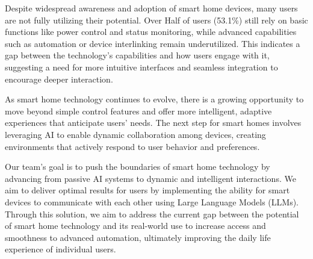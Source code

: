 \documentclass[conference]{IEEEtran}
\begin{document}
    \hspace{0.5em} Despite widespread awareness and adoption of smart home devices, many users are not fully utilizing their potential. Over Half of users (53.1\%) still rely on basic functions like power control and status monitoring, while advanced capabilities such as automation or device interlinking remain underutilized. This indicates a gap between the technology's capabilities and how users engage with it, suggesting a need for more intuitive interfaces and seamless integration to encourage deeper interaction.
    
    \hspace{0.5em} As smart home technology continues to evolve, there is a growing opportunity to move beyond simple control features and offer more intelligent, adaptive experiences that anticipate users' needs. The next step for smart homes involves leveraging AI to enable dynamic collaboration among devices, creating environments that actively respond to user behavior and preferences.
    
    \hspace{0.5em} Our team's goal is to push the boundaries of smart home technology by advancing from passive AI systems to dynamic and intelligent interactions. We aim to deliver optimal results for users by implementing the ability for smart devices to communicate with each other using Large Language Models (LLMs). Through this solution, we aim to address the current gap between the potential of smart home technology and its real-world use to increase access and smoothness to advanced automation, ultimately improving the daily life experience of individual users.
\end{document}
